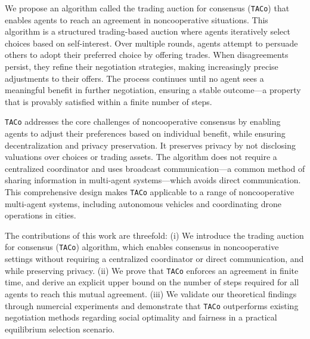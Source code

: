 We propose an algorithm called the trading auction for consensus (\texttt{TACo}) that enables agents to reach an agreement in noncooperative situations. This algorithm is a structured trading-based auction where agents iteratively select choices based on self-interest. Over multiple rounds, agents attempt to persuade others to adopt their preferred choice by offering trades. When disagreements persist, they refine their negotiation strategies, making increasingly precise adjustments to their offers. The process continues until no agent sees a meaningful benefit in further negotiation, ensuring a stable outcome---a property that is provably satisfied within a finite number of steps.

\texttt{TACo} addresses the core challenges of noncooperative consensus by enabling agents to adjust their preferences based on individual benefit, while ensuring decentralization and privacy preservation. It preserves privacy by not disclosing valuations over choices or trading assets. The algorithm does not require a centralized coordinator and uses broadcast communication—a common method of sharing information in multi-agent systems—which avoids direct communication. This comprehensive design makes \texttt{TACo} applicable to a range of noncooperative multi-agent systems, including autonomous vehicles and coordinating drone operations in cities.

The contributions of this work are threefold: (i) We introduce the trading auction for consensus (\texttt{TACo}) algorithm, which enables consensus in noncooperative settings without requiring a centralized coordinator or direct communication, and while preserving privacy. (ii) We prove that \texttt{TACo} enforces an agreement in finite time, and derive an explicit upper bound on the number of steps required for all agents to reach this mutual agreement. (iii) We validate our theoretical findings through numercial experiments and demonstrate that \texttt{TACo} outperforms existing negotiation methods regarding social optimality and fairness in a practical equilibrium selection scenario.
